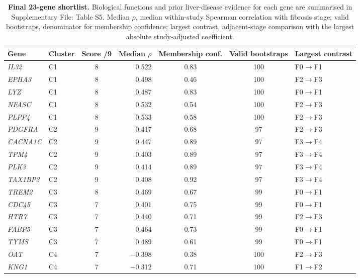 \documentclass[11pt,a4paper]{article}
\begin{document}
\begin{table}[!t]\centering
\caption{\textbf{Final 23-gene shortlist.} Biological functions and prior liver-disease evidence for each gene are summarised in Supplementary File: Table S5. Median $\rho$, median within-study Spearman correlation with fibrosis stage; valid bootstraps, denominator for membership confidence; largest contrast, adjacent-stage comparison with the largest absolute study-adjusted coefficient.}\label{tab:shortlist}
\small\setlength{\tabcolsep}{5pt}\renewcommand{\arraystretch}{1.1}
\begin{tabular}{llcrccl}
\toprule
\rowcolor{white}\textbf{Gene} & \textbf{Cluster} & \textbf{Score /9} & \textbf{Median $\rho$} & \textbf{Membership conf.} & \textbf{Valid bootstraps} & \textbf{Largest contrast} \\
\midrule
\textit{IL32} & C1 & 8 & 0.522 & 0.83 & 100 & F0$\rightarrow$F1 \\
\textit{EPHA3} & C1 & 8 & 0.498 & 0.46 & 100 & F2$\rightarrow$F3 \\
\textit{LYZ} & C1 & 8 & 0.487 & 0.83 & 100 & F0$\rightarrow$F1 \\
\textit{NFASC} & C1 & 8 & 0.532 & 0.54 & 100 & F2$\rightarrow$F3 \\
\textit{PLPP4} & C1 & 8 & 0.533 & 0.58 & 100 & F2$\rightarrow$F3 \\
\textit{PDGFRA} & C2 & 9 & 0.417 & 0.68 & 97 & F2$\rightarrow$F3 \\
\textit{CACNA1C} & C2 & 9 & 0.447 & 0.89 & 97 & F3$\rightarrow$F4 \\
\textit{TPM4} & C2 & 9 & 0.403 & 0.89 & 97 & F3$\rightarrow$F4 \\
\textit{PLK3} & C2 & 9 & 0.414 & 0.89 & 97 & F3$\rightarrow$F4 \\
\textit{TAX1BP3} & C2 & 9 & 0.408 & 0.92 & 97 & F3$\rightarrow$F4 \\
\textit{TREM2} & C3 & 8 & 0.469 & 0.67 & 99 & F0$\rightarrow$F1 \\
\textit{CDC45} & C3 & 7 & 0.401 & 0.75 & 99 & F0$\rightarrow$F1 \\
\textit{HTR7} & C3 & 7 & 0.440 & 0.71 & 99 & F2$\rightarrow$F3 \\
\textit{FABP5} & C3 & 7 & 0.464 & 0.73 & 99 & F0$\rightarrow$F1 \\
\textit{TYMS} & C3 & 7 & 0.489 & 0.61 & 99 & F0$\rightarrow$F1 \\
\textit{OAT} & C4 & 7 & $-$0.398 & 0.38 & 100 & F2$\rightarrow$F3 \\
\textit{KNG1} & C4 & 7 & $-$0.312 & 0.71 & 100 & F1$\rightarrow$F2 \\

\end{tabular}
\end{table}
\end{document}
